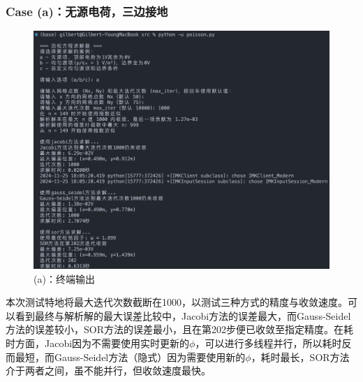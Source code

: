 \subsubsection{Case (a)：无源电荷，三边接地}
\begin{figure}[H]
    \centering
    \includegraphics[width=1.0\textwidth]{Problem_1/figs/a_terminal.png}
    \caption{(a)：终端输出}
\end{figure}
本次测试特地将最大迭代次数截断在1000，以测试三种方式的精度与收敛速度。可以看到最终与解析解的最大误差比较中，Jacobi方法的误差最大，而Gauss-Seidel方法的误差较小，SOR方法的误差最小，且在第202步便已收敛至指定精度。在耗时方面，Jacobi因为不需要使用实时更新的$\phi$，可以进行多线程并行，所以耗时反而最短，而Gauss-Seidel方法（隐式）因为需要使用新的$\phi$，耗时最长，SOR方法介于两者之间，虽不能并行，但收敛速度最快。

